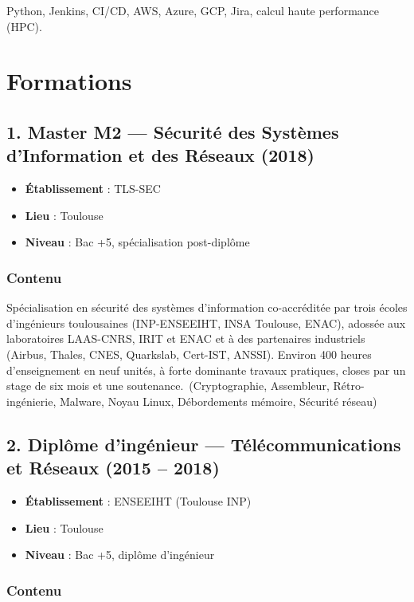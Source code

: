 \documentclass[11pt,a4paper]{article}
\newcommand{\stack}[1]{\ {\small\textcolor{accent}{(#1)}}}
\begin{document}
Python, Jenkins, CI/CD, AWS, Azure, GCP, Jira, calcul haute performance (HPC).

\section{Formations}

\subsection{1. Master M2 --- Sécurité des Systèmes d'Information et des Réseaux (2018)}

\begin{itemize}
  \item \textbf{Établissement} : TLS-SEC
  \item \textbf{Lieu} : Toulouse
  \item \textbf{Niveau} : Bac +5, spécialisation post-diplôme
\end{itemize}

\subsubsection{Contenu}

Spécialisation en sécurité des systèmes d'information co-accréditée par trois écoles d'ingénieurs toulousaines (INP-ENSEEIHT, INSA Toulouse, ENAC), adossée aux laboratoires LAAS-CNRS, IRIT et ENAC et à des partenaires industriels (Airbus, Thales, CNES, Quarkslab, Cert-IST, ANSSI). Environ 400 heures d'enseignement en neuf unités, à forte dominante travaux pratiques, closes par un stage de six mois et une soutenance.\stack{Cryptographie, Assembleur, Rétro-ingénierie, Malware, Noyau Linux, Débordements mémoire, Sécurité réseau}

\subsection{2. Diplôme d'ingénieur --- Télécommunications et Réseaux (2015 -- 2018)}

\begin{itemize}
  \item \textbf{Établissement} : ENSEEIHT (Toulouse INP)
  \item \textbf{Lieu} : Toulouse
  \item \textbf{Niveau} : Bac +5, diplôme d'ingénieur
\end{itemize}

\subsubsection{Contenu}
\end{document}
